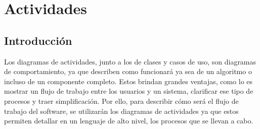 \chapter{Actividades}
\section{Introducción}
Los diagramas de actividades, junto a los de clases y casos de uso, son diagramas de comportamiento, ya que describen como funcionará ya sea de un algoritmo o incluso de un componente completo. Estos brindan grandes ventajas, como lo es mostrar un flujo de trabajo entre los usuarios y un sistema, clarificar ese tipo de procesos y traer simplificación.
Por ello, para describir cómo será el flujo de trabajo del software, se utilizarán los diagramas de actividades ya que estos permiten detallar en un lenguaje de alto nivel, los procesos que se llevan a cabo. 

